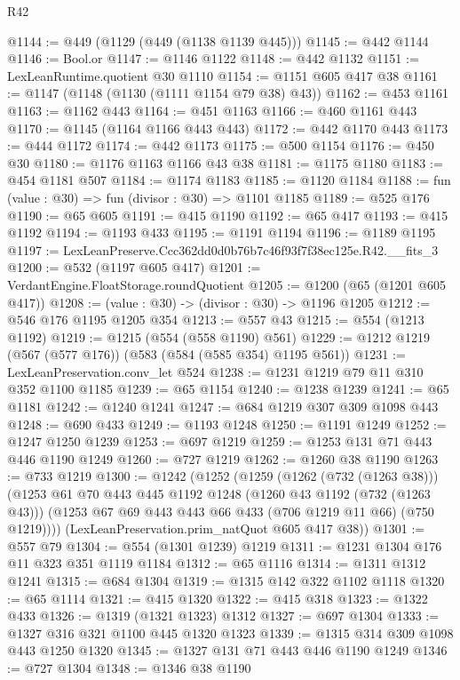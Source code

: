 \begin{lexlean}{R42}
\begin{coremodule}
@1144 := @449 (@1129 (@449 (@1138 @1139 @445)))
@1145 := @442 @1144
@1146 := Bool.or
@1147 := @1146 @1122
@1148 := @442 @1132
@1151 := LexLeanRuntime.quotient @30 @1110
@1154 := @1151 @605 @417 @38
@1161 := @1147 (@1148 (@1130 (@1111 @1154 @79 @38) @43))
@1162 := @453 @1161
@1163 := @1162 @443
@1164 := @451 @1163
@1166 := @460 @1161 @443
@1170 := @1145 (@1164 @1166 @443 @443)
@1172 := @442 @1170 @443
@1173 := @444 @1172
@1174 := @442 @1173
@1175 := @500 @1154
@1176 := @450 @30
@1180 := @1176 @1163 @1166 @43 @38
@1181 := @1175 @1180
@1183 := @454 @1181 @507
@1184 := @1174 @1183
@1185 := @1120 @1184
@1188 := fun (value : @30) => fun (divisor : @30) => @1101 @1185
@1189 := @525 @176
@1190 := @65 @605
@1191 := @415 @1190
@1192 := @65 @417
@1193 := @415 @1192
@1194 := @1193 @433
@1195 := @1191 @1194
@1196 := @1189 @1195
@1197 := LexLeanPreserve.Ccc362dd0d0b76b7c46f93f7f38ec125e.R42.__fits_3
@1200 := @532 (@1197 @605 @417)
@1201 := VerdantEngine.FloatStorage.roundQuotient
@1205 := @1200 (@65 (@1201 @605 @417))
@1208 := (value : @30) -> (divisor : @30) -> @1196 @1205
@1212 := @546 @176 @1195 @1205 @354
@1213 := @557 @43
@1215 := @554 (@1213 @1192)
@1219 := @1215 (@554 (@558 @1190) @561)
@1229 := @1212 @1219 (@567 (@577 @176)) (@583 (@584 (@585 @354) @1195 @561))
@1231 := LexLeanPreservation.conv_let @524
@1238 := @1231 @1219 @79 @11 @310 @352 @1100 @1185
@1239 := @65 @1154
@1240 := @1238 @1239
@1241 := @65 @1181
@1242 := @1240 @1241
@1247 := @684 @1219 @307 @309 @1098 @443
@1248 := @690 @433
@1249 := @1193 @1248
@1250 := @1191 @1249
@1252 := @1247 @1250 @1239
@1253 := @697 @1219
@1259 := @1253 @131 @71 @443 @446 @1190 @1249
@1260 := @727 @1219
@1262 := @1260 @38 @1190
@1263 := @733 @1219
@1300 := @1242
    (@1252
      (@1259
        (@1262 (@732 (@1263 @38)))
        (@1253
          @61
          @70
          @443
          @445
          @1192
          @1248
          (@1260 @43 @1192 (@732 (@1263 @43)))
          (@1253 @67 @69 @443 @443 @66 @433 (@706 @1219 @11 @66) (@750 @1219))))
      (LexLeanPreservation.prim_natQuot @605 @417 @38))
@1301 := @557 @79
@1304 := @554 (@1301 @1239) @1219
@1311 := @1231 @1304 @176 @11 @323 @351 @1119 @1184
@1312 := @65 @1116
@1314 := @1311 @1312 @1241
@1315 := @684 @1304
@1319 := @1315 @142 @322 @1102 @1118
@1320 := @65 @1114
@1321 := @415 @1320
@1322 := @415 @318
@1323 := @1322 @433
@1326 := @1319 (@1321 @1323) @1312
@1327 := @697 @1304
@1333 := @1327 @316 @321 @1100 @445 @1320 @1323
@1339 := @1315 @314 @309 @1098 @443 @1250 @1320
@1345 := @1327 @131 @71 @443 @446 @1190 @1249
@1346 := @727 @1304
@1348 := @1346 @38 @1190

\end{coremodule}
\end{lexlean}
